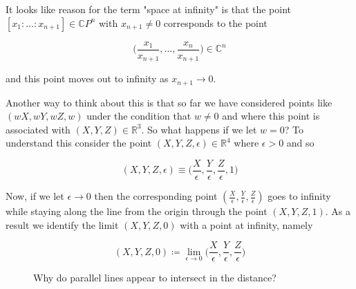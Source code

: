 \documentclass{article}
\theoremstyle{definition}
\begin{document}
\bigskip
\noindent
It looks like reason for the term "space at infinity" is that the point $[x_1:\hdots:x_{n+1}] \in \mathbb{C}P^n$ with $x_{n+1} \neq 0$ corresponds to the point


\bigskip
\begin{equation*}
\Bigg (  \frac{x_1}{x_{n+1}}, \hdots, \frac{x_n}{x_{n+1}} \Bigg ) \in \mathbb{C}^n
\end{equation*}

\bigskip
\noindent
and this point moves out to infinity as $x_{n+1} \to 0$. 

\bigskip
\noindent
Another way to think about this is that so far we have considered points like $(wX,wY,wZ,w)$ under the condition that $w \neq 0$ 
and where this point  is associated with $(X,Y,Z) \in \mathbb{R}^3$. So what happens if we let $w = 0$? To understand this consider the point 
$(X, Y, Z, \epsilon) \in \mathbb{R}^4$ where $\epsilon > 0$ and so

\begin{equation*}
(X,Y,Z,\epsilon) \equiv  \bigg ( \frac{X}{\epsilon}, \frac{Y}{\epsilon}, \frac{Z}{\epsilon}, 1 \bigg )
\end{equation*}

\bigskip
\noindent
Now, if we let $\epsilon \to 0$  then the corresponding point $(\frac{X}{\epsilon} , \frac{Y}{\epsilon} , \frac{Z}{\epsilon} )$ goes to infinity while staying along the line 
from the origin through the point $(X, Y, Z, 1)$. As a result we identify the limit $(X, Y, Z, 0)$ with a point at infinity, namely 

\bigskip
\begin{equation*}
(X, Y, Z, 0) \coloneqq \lim_{\epsilon \to 0} \bigg  (\frac{X}{\epsilon} , \frac{Y}{\epsilon} , \frac{Z}{\epsilon} \bigg )
\end{equation*}

\begin{figure}
\caption{Why do parallel lines appear to intersect in the distance?}
\label{fig:parallel_lines}
\end{figure}
\end{document}
